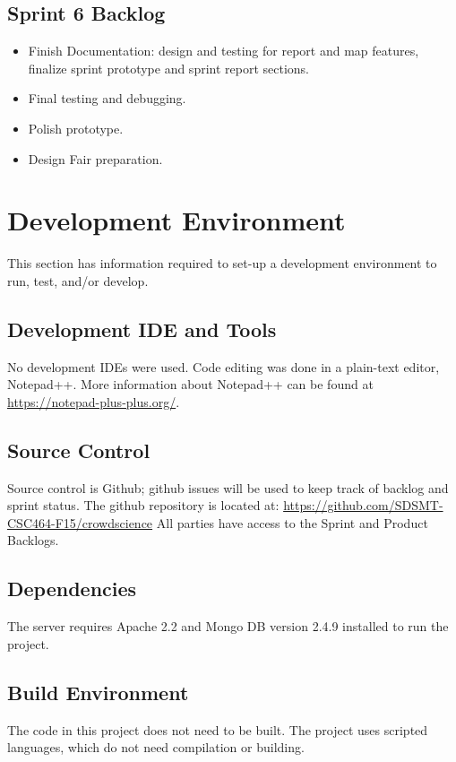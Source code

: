 \subsection{Sprint 6 Backlog}
\begin{itemize}
\itemsep0em
\item Finish Documentation: design and testing for report and map features, finalize sprint prototype and sprint report sections.
\item Final testing and debugging.
\item Polish prototype.
\item Design Fair preparation.
\end{itemize}


\section{Development Environment}
This section has information required to set-up a development environment to run, test, and/or develop. 

\subsection{Development IDE and Tools}
No development IDEs were used. Code editing was done in a plain-text editor, Notepad++. More information about Notepad++ can be found at \url{https://notepad-plus-plus.org/}.

\subsection{Source  Control}
Source control is Github; github issues will be used to keep track of backlog and sprint status. The github repository is located at: \url{https://github.com/SDSMT-CSC464-F15/crowdscience} All parties have access to the Sprint and Product Backlogs.

\subsection{Dependencies}
The server requires Apache 2.2 and Mongo DB version 2.4.9 installed to run the project.

\subsection{Build  Environment}
The code in this project does not need to be built. The project uses scripted languages, which do not need compilation or building. 

